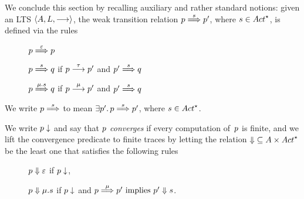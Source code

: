 We conclude this section by recalling auxiliary and rather standard
notions: given an LTS $\langle A, L, \mathrel{\overset{}\longrightarrow} \rangle$,
the weak transition relation $\state \wt{ \trace } \stateA $,
where $ \trace \in\Actfin$,
is defined via the rules
\begin{description}
\item[]
  $p \mathrel{\overset{\varepsilon} \Longrightarrow} p$
\item[]
  $p \mathrel{\overset{ s } \Longrightarrow} q$ if $\state\st{\tau}\stateA$
  and $\stateA \wt{ \trace } \stateB$
\item[]
  $p \mathrel{\overset{\mu.s} \Longrightarrow} q$ if $\state \st{\mu} \stateA$
  and $\stateA \wt{\trace} \stateB$
\end{description}
We write $ p \mathrel{\overset{ s } \Longrightarrow}  $ to mean  $\exists \stateA \suchthat \state
                                     \wt{ \trace } \stateA$, where $\trace \in
                                     \Actfin$.



\renewcommand{\stateA}{p'}
We write $p \downarrow$ and say that {\em $p$ converges} if every
computation of~$p$ is finite, and we lift the convergence predicate
to finite traces by letting the relation
${\cnvalong} \subseteq \States \times \Actfin$ be the least one that
satisfies the following rules%
\begin{description}
\item[\cnvepsilon] $p \mathrel{\Downarrow} \varepsilon$ if $p \downarrow$,
\item[\cnvmu] $ p \mathrel{\Downarrow} \mu.s $ if $p \downarrow$ and
  $\state \wt{\mu} \stateA \implies \stateA \cnvalong \trace$.
\end{description}



